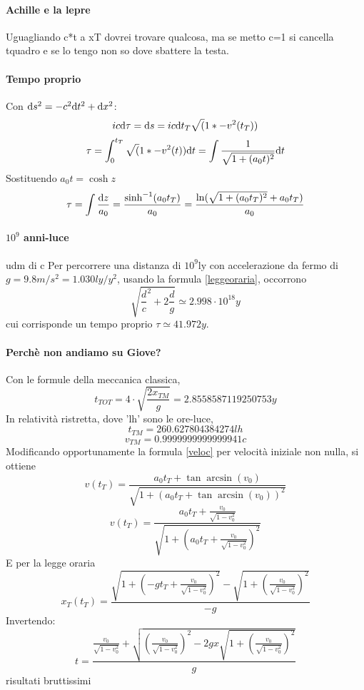 \paragraph {Achille e la lepre}
Uguagliando c*t a xT dovrei trovare qualcosa, ma se metto c=1 si cancella tquadro e se lo tengo non so dove sbattere la testa.

\paragraph {Tempo proprio}
Con \(\mathrm{d} s^2 = -c^2\mathrm{d} t^2 + \mathrm{d} x^2 \):
\[ ic\mathrm{d}\tau = \mathrm{d} s = ic\mathrm{d} t_T \sqrt(1*-v^2(t_T)) \]
\[ \tau = \int_0^{t_T} \sqrt(1*-v^2(t)) \mathrm{d} t = \int \frac{1}{\sqrt{1+(a_0t)^2}} \mathrm{d} t \]
Sostituendo \( a_0t = \cosh z \)
\[ \tau = \int \frac {\mathrm{d} z}{a_0} = \frac{\sinh^{-1}(a_0t_T)}{a_0} = \frac{\ln({\sqrt{1+(a_0t_T)^2}+a_0t_T)}}{a_0}\]

\paragraph {$10^9$ anni-luce} \todo udm di c
Per percorrere una distanza di $10^9 \mathrm{ly}$ con accelerazione da fermo di \(g=9.8m/s^2=1.030ly/y^2\), usando la formula \ref{leggeoraria}, occorrono
\[ \sqrt{\frac{d}{c}^2 + 2\frac{d}{g}} \simeq 2.998\cdot10^18y \]
cui corrisponde un tempo proprio \( \tau \simeq 41.972 y \).

\paragraph {Perch\`e non andiamo su Giove?}
Con le formule della meccanica classica,
\[ t_{TOT} = 4\cdot \sqrt{\frac{2x_{TM}}{g}} = 2.8558587119250753 y \]
In relativit\`a ristretta, dove 'lh' sono le ore-luce,
\[ t_{TM} = 260.627804384274lh \]
\[ v_{TM} = 0.9999999999999941 c \]
Modificando opportunamente la formula \ref{veloc} per velocit\`a iniziale non nulla, si ottiene
\[ v(t_T) = \frac{a_0 t_T + \tan\arcsin(v_0)          }
	{\sqrt{1+( a_0t_T + \tan\arcsin(v_0)           )^2 }}  \]
\[ v(t_T) = \frac{a_0 t_T + \frac{v_0}{\sqrt{1-v_0^2}} }
	{\sqrt{1+( a_0t_T + \frac{v_0}{\sqrt{1-v_0^2}}  )^2 }}  \]
E per la legge oraria
\[ x_T(t_T) = \frac{\sqrt{1+ (-gt_T + \frac{v_0}{\sqrt{1-v_0^2}})^2 } - 
	\sqrt{1+  (\frac{v_0}{\sqrt{1-v_0^2}})^2}     }{-g} \]
Invertendo:
\[ t = \frac{ \frac{v_0}{\sqrt{1-v_0^2}} + \sqrt{ (\frac{v_0}{\sqrt{1-v_0^2}})^2 - 2gx \sqrt{1+( \frac{v_0}{\sqrt{1-v_0^2}}    )^2     }  } }
             {  g   }\]
\todo risultati bruttissimi

